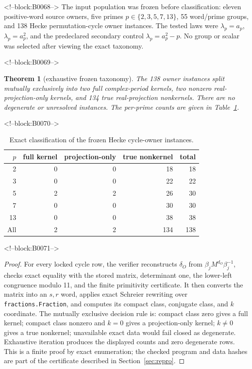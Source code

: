 \documentclass[11pt]{article}
\newtheorem{theorem}{Theorem}[section]
\theoremstyle{definition}
\theoremstyle{remark}
\begin{document}
<!--block:B0068-->
The input population was frozen before classification: eleven positive-word source owners, five primes $p\in\{2,3,5,7,13\}$, 55 word/prime groups, and 138 Hecke permutation-cycle owner instances. The tested laws were $\lambda_p=a_p$, $\lambda_p=a_p^2$, and the predeclared secondary control $\lambda_p=a_p^2-p$. No group or scalar was selected after viewing the exact taxonomy.

<!--block:B0069-->
\begin{theorem}[exhaustive frozen taxonomy]\label{thm:taxonomy}
The 138 owner instances split mutually exclusively into two full complex-period kernels, two nonzero real-projection-only kernels, and 134 true real-projection nonkernels. There are no degenerate or unresolved instances. The per-prime counts are given in Table~\ref{tab:instances}.
\end{theorem}

<!--block:B0070-->
\begin{table}[ht]
\centering
\caption{Exact classification of the frozen Hecke cycle-owner instances.}
\label{tab:instances}
\begin{tabular}{rrrrr}
\toprule
$p$ & full kernel & projection-only & true nonkernel & total\\
\midrule
2  & 0 & 0 & 18 & 18\\
3  & 0 & 0 & 22 & 22\\
5  & 2 & 2 & 26 & 30\\
7  & 0 & 0 & 30 & 30\\
13 & 0 & 0 & 38 & 38\\
\midrule
All & 2 & 2 & 134 & 138\\
\bottomrule
\end{tabular}
\end{table}

<!--block:B0071-->
\begin{proof}
For every locked cycle row, the verifier reconstructs $\delta_O$ from $\beta_jM^{d_O}\beta_j^{-1}$, checks exact equality with the stored matrix, determinant one, the lower-left congruence modulo 11, and the finite primitivity certificate. It then converts the matrix into an $s,r$ word, applies exact Schreier rewriting over \texttt{fractions.Fraction}, and computes its compact class, conjugate class, and $k$ coordinate. The mutually exclusive decision rule is: compact class zero gives a full kernel; compact class nonzero and $k=0$ gives a projection-only kernel; $k\neq0$ gives a true nonkernel; unavailable exact data would fail closed as degenerate. Exhaustive iteration produces the displayed counts and zero degenerate rows. This is a finite proof by exact enumeration; the checked program and data hashes are part of the certificate described in Section~\ref{sec:repro}.
\end{proof}
\end{document}
